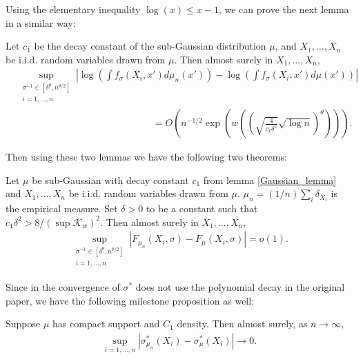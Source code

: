 \documentclass[10pt]{article}
\begin{document}
Using the elementary inequality $\log(x) \leq x-1$, we can prove the next lemma in a similar way:
\begin{lemma}
  Let $c_1$ be the decay constant of the sub-Gaussian distribution $\mu$, and $X_1,\dots,X_n$ be i.i.d. random variables drawn from $\mu$. Then almost surely in $X_1,\dots,X_n$,
  \begin{align}
     & \sup_{\substack{\sigma^{-1} \in [\delta^{\theta},n^{\theta/2}]                                                                                                               \\ i = 1,\dots, n}} \left| \log\left(\int f_{\sigma}(X_i,x') d\mu_n(x')\right)- \log\left(\int f_{\sigma}(X_i,x') d\mu(x')\right) \right| \nonumber \\
     & \qquad \qquad \qquad \qquad \qquad \qquad \qquad= O\left(n^{-1/2} \exp \left(w\left(\left(\sqrt{\frac{4}{c_1\delta^2}}\sqrt{\log n} \right)^{\theta} \right) \right)\right).
  \end{align}
\end{lemma}
Then using these two lemmas we have the following two theorems:
\begin{proposition}
  Let $\mu$ be sub-Gaussian with decay constant $c_1$ from lemma \ref{Gaussian_lemma} and $X_1,\dots,X_n$ be i.i.d. random variables drawn from $\mu$. $\mu_n = (1/n)\sum_i \delta_{X_i}$ is the empirical measure. Set $\delta>0$ to be a constant such that $c_1\delta^2 > 8/(\sup \mathcal{K}_w)^2$. Then almost surely in $X_1,\dots,X_n$,
  \begin{align}
    \sup_{\substack{\sigma^{-1} \in [\delta^{\theta},n^{\theta/2}] \\ i = 1,\dots, n}} \left|F_{\mu_n}(X_i,\sigma)-F_{\mu}(X_i,\sigma)\right| = o(1).
  \end{align}
\end{proposition}
Since in \cite{auffinger-tsne} the convergence of $\sigma^*$ does not use the polynomial decay in the original paper, we have the following milestone proposition as well:
\begin{proposition}
  Suppose $\mu$ has compact support and $C_1$ density. Then almost surely, as $n \to \infty$,
  \begin{align}
    \sup_{i=1,\dots,n} \left|\sigma_{\mu_n}^*(X_i)-\sigma_{\mu}^*(X_i)\right| \to 0.
  \end{align}
\end{proposition}
\end{document}
